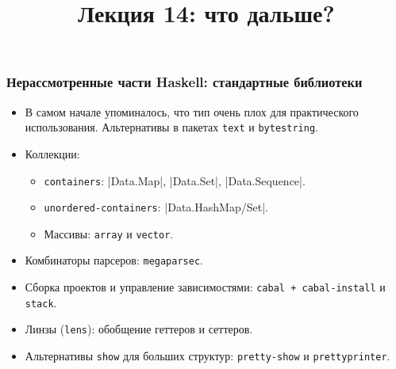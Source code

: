 \documentclass[11pt]{beamer}
\title{Лекция 14: что дальше?}
\begin{document}
\begin{frame}[plain]
    \maketitle
\end{frame}

\begin{frame}[fragile]
\frametitle{Нерассмотренные части Haskell: стандартные библиотеки}
\begin{itemize}
    \item В самом начале упоминалось, что тип  очень плох для практического использования. Альтернативы в пакетах \lstinline|text| и \lstinline|bytestring|.
    \item Коллекции: 
    \begin{itemize}
        \item \lstinline|containers|: \haskinline|Data.Map|, \haskinline|Data.Set|, \haskinline|Data.Sequence|.
        \item \lstinline|unordered-containers|: \haskinline|Data.Hash{Map/Set}|.
        \item Массивы: \lstinline|array| и \lstinline|vector|.
    \end{itemize}
    \item Комбинаторы парсеров: \lstinline|megaparsec|.
    \item Сборка проектов и управление зависимостями: \lstinline|cabal + cabal-install| и \lstinline|stack|.
    \item Линзы (\lstinline|lens|): обобщение геттеров и сеттеров.
    \item Альтернативы \lstinline|show| для больших структур: \lstinline|pretty-show| и \lstinline|prettyprinter|.
\end{itemize}
\end{frame}
\end{document}
